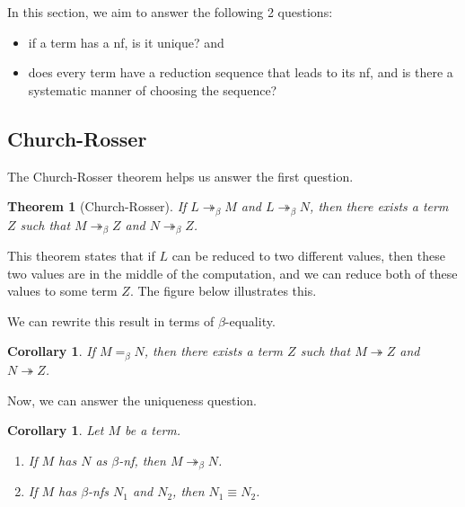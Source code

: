 \documentclass[a4paper, openany]{memoir}
\newtheorem{theorem}[proposition]{Theorem}
\newtheorem{corollary}[proposition]{Corollary}
\theoremstyle{definition}
\begin{document}
    In this section, we aim to answer the following 2 questions:
    \begin{itemize}
        \item if a term has a nf, is it unique? and
        \item does every term have a reduction sequence that leads to its nf, and is there a systematic manner of choosing the sequence?
    \end{itemize}

    \subsection{Church-Rosser}
    The Church-Rosser theorem helps us answer the first question.
    \begin{theorem}[Church-Rosser]
        If $L \twoheadrightarrow_\beta M$ and $L \twoheadrightarrow_\beta N$, then there exists a term $Z$ such that $M \twoheadrightarrow_\beta Z$ and $N \twoheadrightarrow_\beta Z$.
    \end{theorem}
    \noindent This theorem states that if $L$ can be reduced to two different values, then these two values are in the middle of the computation, and we can reduce both of these values to some term $Z$. The figure below illustrates this.
    \begin{figure}[H]
        \centering
    \end{figure}
    \noindent We can rewrite this result in terms of $\beta$-equality.
    \begin{corollary}
        If $M =_\beta N$, then there exists a term $Z$ such that $M \twoheadrightarrow Z$ and $N \twoheadrightarrow Z$.
    \end{corollary}
    \noindent Now, we can answer the uniqueness question.
    \begin{corollary}
        Let $M$ be a term.
        \begin{enumerate}
            \item If $M$ has $N$ as $\beta$-nf, then $M \twoheadrightarrow_\beta N$.
            \item If $M$ has $\beta$-nfs $N_1$ and $N_2$, then $N_1 \equiv N_2$.
        \end{enumerate}
    \end{corollary}
\end{document}
